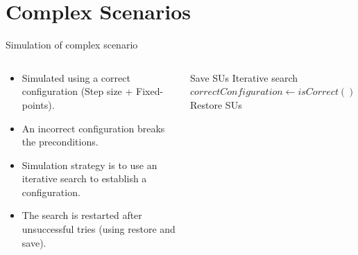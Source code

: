\documentclass{beamer}
\begin{document}
\section{Complex Scenarios}


\begin{frame}{Simulation of complex scenario}
    \begin{columns}[T]
        \begin{column}{0.5\textwidth}
            \begin{itemize}
                \item Simulated using a correct configuration (Step size + Fixed-points).
                \item An incorrect configuration breaks the preconditions.
                \item Simulation strategy is to use an iterative search to establish a configuration.
                \item The search is restarted after unsuccessful tries (using restore and save).
            \end{itemize}
        \end{column}
        \begin{column}{0.5\textwidth}
            \begin{algorithm}[H]
                \caption{Simulation of complex scenarios.}
            \label{alg:algorithm_step}
            \begin{algorithmic}[1]
              \scriptsize
                \State Save SUs
                \State Iterative search
                \State $correctConfiguration \gets isCorrect()$
                    \State Restore SUs
                \EndIf
                \EndWhile
            \end{algorithmic} 
          \end{algorithm}
        \end{column}
    \end{columns}    
\end{frame}
\end{document}
